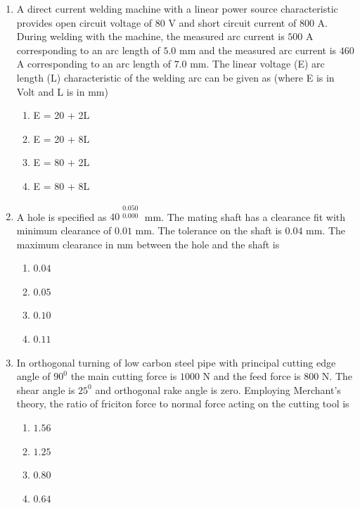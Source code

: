 \documentclass[journal]{IEEEtran}
\begin{document}
\begin{enumerate}[start = 52]
    \item A direct current welding machine with a linear power source characteristic provides open circuit voltage of $80$ V and short circuit current of $800$ A. During welding with the machine, the measured arc current is $500$ A corresponding to an arc length of $5.0$ mm and the measured arc current is $460$ A corresponding to an arc length of $7.0$ mm. The linear voltage (E) arc length (L) characteristic of the welding arc can be given as (where E is in Volt and L is in mm)
    \begin{multicols}{4}
        \begin{enumerate}
            \item E = 20 + 2L
            \item E = 20 + 8L
            \item E = 80 + 2L
            \item E = 80 + 8L
        \end{enumerate}
    \end{multicols}

    \item A hole is specified as $40^{\begin{matrix} 0.050 \\ 0.000 \end{matrix}}$ mm. The mating shaft has a clearance fit with minimum clearance of $0.01$ mm. The tolerance on the shaft is $0.04$ mm. The maximum clearance in mm between the hole and the shaft is
    \begin{multicols}{4}
        \begin{enumerate}
            \item $0.04$
            \item $0.05$
            \item $0.10$
            \item $0.11$
        \end{enumerate}
    \end{multicols}

    \item In orthogonal turning of low carbon steel pipe with principal cutting edge angle of $90^{0}$ the main cutting force is $1000$ N and the feed force is $800$ N. The shear angle is $25^{0}$ and orthogonal rake angle is zero. Employing Merchant's theory, the ratio of friciton force to normal force acting on the cutting tool is
    \begin{multicols}{4}
        \begin{enumerate}
            \item $1.56$
            \item $1.25$
            \item $0.80$
            \item $0.64$
        \end{enumerate}
    \end{multicols}


\end{enumerate}
\end{document}
